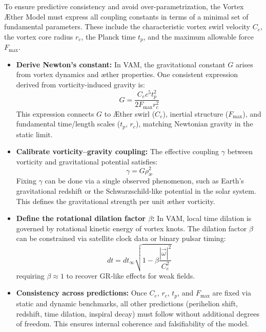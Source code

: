 To ensure predictive consistency and avoid over-parametrization, the Vortex Æther Model must express all coupling constants in terms of a minimal set of fundamental parameters. These include the characteristic vortex swirl velocity $C_e$, the vortex core radius $r_c$, the Planck time $t_p$, and the maximum allowable force $F_{\max}$.

\begin{itemize}
    \item \textbf{Derive Newton’s constant:} In VAM, the gravitational constant $G$ arises from vortex dynamics and æther properties. One consistent expression derived from vorticity-induced gravity is:
    \begin{equation}
        G = \frac{C_e c^5 t_p^2}{2 F_{\max} r_c^2}
    \end{equation}
    This expression connects $G$ to Æther swirl ($C_e$), inertial structure ($F_{\max}$), and fundamental time/length scales ($t_p$, $r_c$), matching Newtonian gravity in the static limit.

    \item \textbf{Calibrate vorticity–gravity coupling:} The effective coupling $\gamma$ between vorticity and gravitational potential satisfies:
    \begin{equation}
        \gamma = G \rho_\text{\ae}^2
    \end{equation}
    Fixing $\gamma$ can be done via a single observed phenomenon, such as Earth’s gravitational redshift or the Schwarzschild-like potential in the solar system. This defines the gravitational strength per unit æther vorticity.

    \item \textbf{Define the rotational dilation factor $\beta$:} In VAM, local time dilation is governed by rotational kinetic energy of vortex knots. The dilation factor $\beta$ can be constrained via satellite clock data or binary pulsar timing:
    \[
    dt = dt_\infty \sqrt{1 - \beta \frac{|\vec{\omega}|^2}{C_e^2}}
    \]
    requiring $\beta \approx 1$ to recover GR-like effects for weak fields.

    \item \textbf{Consistency across predictions:} Once $C_e$, $r_c$, $t_p$, and $F_{\max}$ are fixed via static and dynamic benchmarks, all other predictions (perihelion shift, redshift, time dilation, inspiral decay) must follow without additional degrees of freedom. This ensures internal coherence and falsifiability of the model.
\end{itemize}



